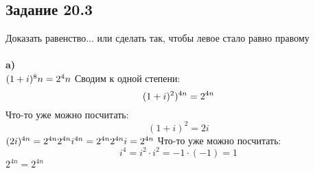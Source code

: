 \documentclass[12pt]{article}
\begin{document}
\newpage
\subsection{Задание 20.3}
Доказать равенство... или сделать так, чтобы левое стало равно правому\\
\\
\textbf{a)}\\
$
(1+i)^8n=2^4n\\
$
Сводим к одной степени:
$$
(1+i)^2)^{4n}=2^{4n}\\
$$
Что-то уже можно посчитать:
$$
(1+i)^2 = 2i
$$
$
(2i)^{4n}=2^{4n}\\
2^{4n}i^{4n}=2^{4n}\\
2^{4n}i=2^{4n} \\
$
Что-то уже можно посчитать:
$$
i^4=i^2\cdot i^2=-1\cdot(-1)=1
$$
$
2^{4n}=2^{4n}
$
\end{document}
